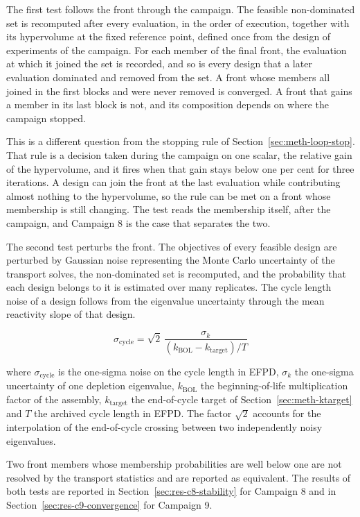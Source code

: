 The first test follows the front through the campaign. The feasible
non-dominated set is recomputed after every evaluation, in the order of
execution, together with its hypervolume at the fixed reference point,
defined once from the design of experiments of the campaign. For each
member of the final front, the evaluation at which it joined the set is
recorded, and so is every design that a later evaluation dominated and
removed from the set. A front whose members all joined in the first
blocks and were never removed is converged. A front that gains a member
in its last block is not, and its composition depends on where the
campaign stopped.

This is a different question from the stopping rule of
Section~\ref{sec:meth-loop-stop}. That rule is a decision taken during
the campaign on one scalar, the relative gain of the hypervolume, and
it fires when that gain stays below one per cent for three iterations.
A design can join the front at the last evaluation while contributing
almost nothing to the hypervolume, so the rule can be met on a front
whose membership is still changing. The test reads the membership
itself, after the campaign, and Campaign 8 is the case that separates
the two.

The second test perturbs the front. The objectives of every feasible
design are perturbed by Gaussian noise representing the Monte Carlo
uncertainty of the transport solves, the non-dominated set is
recomputed, and the probability that each design belongs to it is
estimated over many replicates. The cycle length noise of a design
follows from the eigenvalue uncertainty through the mean reactivity
slope of that design.

\begin{equation}
  \sigma_{\mathrm{cycle}} = \sqrt{2}\,\frac{\sigma_k}{\left(k_{\mathrm{BOL}} - k_{\mathrm{target}}\right)/T}
  \label{eq:val-sigma-cycle}
\end{equation}

\noindent where $\sigma_\mathrm{cycle}$ is the one-sigma noise on the
cycle length in EFPD, $\sigma_k$ the one-sigma uncertainty of one
depletion eigenvalue, $k_\mathrm{BOL}$ the beginning-of-life
multiplication factor of the assembly, $k_\mathrm{target}$ the
end-of-cycle target of Section~\ref{sec:meth-ktarget} and $T$ the
archived cycle length in EFPD. The factor $\sqrt{2}$ accounts for the
interpolation of the end-of-cycle crossing between two independently
noisy eigenvalues.

Two front members whose membership probabilities are well below one are
not resolved by the transport statistics and are reported as
equivalent. The results of both tests are reported in
Section~\ref{sec:res-c8-stability} for Campaign 8 and in
Section~\ref{sec:res-c9-convergence} for Campaign 9.

